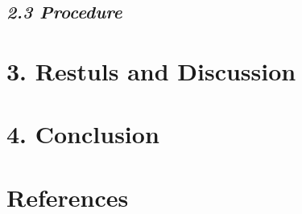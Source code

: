 \documentclass[man, fleqn, noextraspace]{apa6}
\begin{document}
\subsection{\texorpdfstring{\emph{2.3
Procedure}}{2.3 Procedure}}\label{procedure}

\section{\texorpdfstring{\textbf{3. Restuls and
Discussion}}{3. Restuls and Discussion}}\label{restuls-and-discussion}

\section{\texorpdfstring{\textbf{4.
Conclusion}}{4. Conclusion}}\label{conclusion}

\newpage

\section{\texorpdfstring{\textbf{References}}{References}}\label{references}

\begingroup
\setlength{\parindent}{-0.5in} \setlength{\leftskip}{0.5in}

\hypertarget{refs}{}

\endgroup
\end{document}
